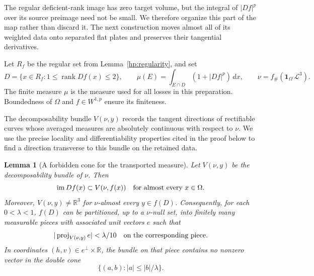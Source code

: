 \documentclass[11pt]{article}
\numberwithin{equation}{section}
\newtheorem{lemma}[theorem]{Lemma}
\theoremstyle{definition}
\theoremstyle{remark}
\newcommand{\R}{\mathbb R}
\newcommand{\cL}{\mathcal L}
\DeclareMathOperator{\rank}{rank}
\begin{document}
The regular deficient-rank image has zero target volume, but the
integral of $|Df|^p$ over its source preimage need not be small.  We
therefore organize this part of the map rather than discard it.
The next construction moves almost all of its weighted data onto
separated flat plates and preserves their tangential derivatives.

Let $R_f$ be the regular set from Lemma~\ref{hp:regularity}, and set
\[
 D=\{x\in R_f:1\le\rank Df(x)\le2\},
 \qquad
 \mu(E)=\int_{E\cap D}(1+|Df|^p)\,dx,
 \qquad
 \nu=f_\#(\mathbf1_\Omega\,\cL^3).
\]
The finite measure $\mu$ is the measure used for all losses in this
preparation.  Boundedness of $\Omega$ and $f\in W^{1,p}$ ensure
its finiteness.

The decomposability bundle $V(\nu,y)$ records the tangent directions
of rectifiable curves whose averaged measures are absolutely continuous
with respect to $\nu$.  We use the precise locality and differentiability
properties cited in the proof below to find a direction transverse to
this bundle on the retained data.

\begin{lemma}[A forbidden cone for the transported measure]
\label{hp:transported-bundle}
Let $V(\nu,y)$ be the decomposability bundle of $\nu$.  Then
\begin{equation}\label{hp:range-in-bundle}
 \operatorname{im}Df(x)\subset V(\nu,f(x))
 \quad\hbox{for almost every }x\in\Omega.
\end{equation}
Moreover, $V(\nu,y)\ne\R^3$ for $\nu$-almost every $y\in f(D)$.
Consequently, for each $0<\lambda<1$, $f(D)$ can be partitioned,
up to a $\nu$-null set, into finitely many measurable pieces with
associated unit vectors $e$ such that
\begin{equation}\label{hp:almost-normal-direction}
 |\operatorname{proj}_{V(\nu,y)}e|<\lambda/10
 \quad\hbox{on the corresponding piece}.
\end{equation}
In coordinates $(h,v)\in e^\perp\times\R$, the bundle on that piece
contains no nonzero vector in the double cone
\[
 \{(a,b):|a|\le |b|/\lambda\}.
\]
\end{lemma}
\end{document}
